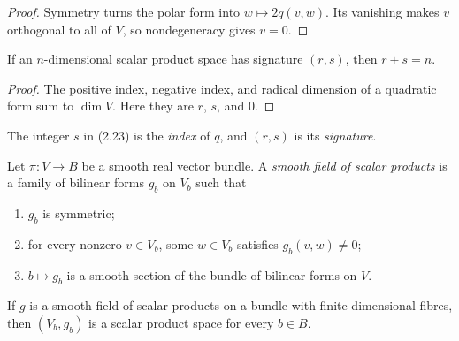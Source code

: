 \begin{proof}

\sketch Symmetry turns the polar form into $w\mapsto2q(v,w)$. Its vanishing makes
$v$ orthogonal to all of $V$, so nondegeneracy gives $v=0$.
\end{proof}

\begin{corollary}[$r + s = n$, without a basis]
\label{cor:scalar-product-signature-sum}





If an $n$-dimensional scalar product space has signature $(r,s)$, then
$r+s=n$.
\end{corollary}

\begin{proof}

\sketch The positive index, negative index, and radical dimension of a quadratic
form sum to $\dim V$. Here they are $r$, $s$, and $0$.
\end{proof}

The integer $s$ in (2.23) is the \emph{index} of $q$, and $(r,s)$ is its
\emph{signature}.

\begin{definition}
\label{def:smooth-field-scalar-products}





Let $\pi\colon V\to B$ be a smooth real vector bundle. A \emph{smooth field of
scalar products} is a family of bilinear forms $g_b$ on $V_b$ such that
\begin{enumerate}[label=(\alph*)]
\item $g_b$ is symmetric;
\item for every nonzero $v\in V_b$, some $w\in V_b$ satisfies $g_b(v,w)\ne0$;
\item $b\mapsto g_b$ is a smooth section of the bundle of bilinear forms on $V$.
\end{enumerate}
\end{definition}

\begin{lemma}
\label{lem:pseudo-metric-fibre-scalar-product}





If $g$ is a smooth field of scalar products on a bundle with finite-dimensional
fibres, then $(V_b,g_b)$ is a scalar product space for every $b\in B$.
\end{lemma}

